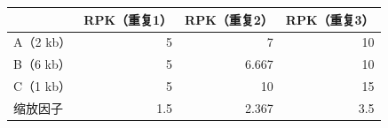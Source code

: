 \begin{table}[htbp]
\centering
{}
\label{tab:ch04a-04}
\begin{tabular}{lrrr}
\toprule
&RPK（重复1）&RPK（重复2）&RPK（重复3）\\
\midrule
A（2 kb） & 5 & 7 & 10\\
B（6 kb） & 5 & 6.667 & 10\\
C（1 kb） & 5 & 10 & 15\\
缩放因子 & 1.5 & 2.367 & 3.5\\
\bottomrule
\end{tabular}
\end{table}
